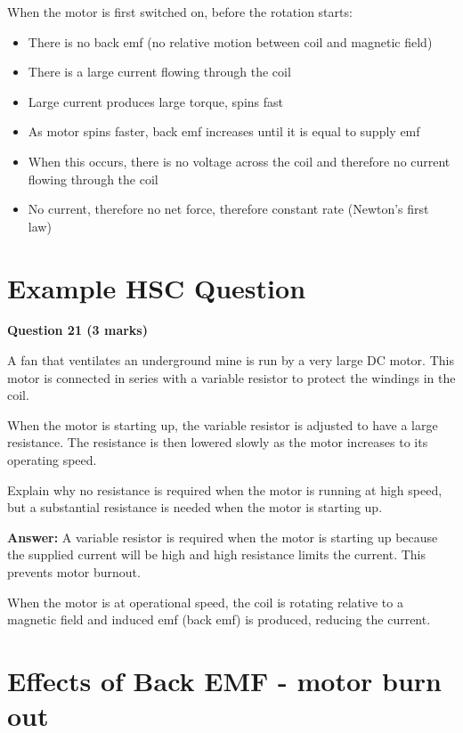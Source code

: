 	When the motor is first switched on, before the rotation starts:
	\begin{itemize}
		\item There is no back emf (no relative motion between coil and magnetic field)
		\item There is a large current flowing through the coil
		\item Large current produces large torque, spins fast
		\item As motor spins faster, back emf increases until it is equal to supply emf
		\item When this occurs, there is no voltage across the coil and therefore no current flowing through the coil
		\item No current, therefore no net force, therefore constant rate (Newton's first law)
	\end{itemize}

\section{Example HSC Question} \label{11/03/2025}

	\textbf{Question 21 (3 marks)}

	A fan that ventilates an underground mine is run by a very large DC motor. This motor is connected in series with a variable resistor to protect the windings in the coil.

	When the motor is starting up, the variable resistor is adjusted to have a large resistance. The resistance is then lowered slowly as the motor increases to its operating speed.

	Explain why no resistance is required when the motor is running at high speed, but a substantial resistance is needed when the motor is starting up.



	\textbf{Answer:} A variable resistor is required when the motor is starting up because the supplied current will be high and high resistance limits the current. This prevents motor burnout.

	When the motor is at operational speed, the coil is rotating relative to a magnetic field and induced emf (back emf) is produced, reducing the current.

\newpage

\section{Effects of Back EMF - motor burn out}

